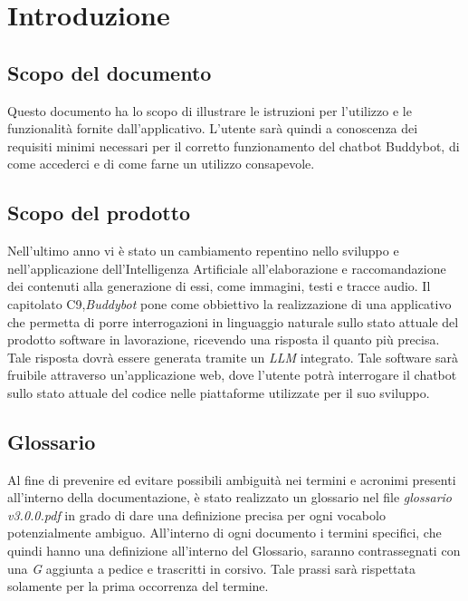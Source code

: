 

\section{Introduzione}
\label{sec:introduzione}

\subsection{Scopo del documento}
Questo documento ha lo scopo di illustrare le istruzioni per l’utilizzo e le funzionalità fornite
dall’applicativo. L’utente sarà quindi a conoscenza dei requisiti minimi necessari per il
corretto funzionamento del chatbot Buddybot, di come accederci e di come farne un utilizzo
consapevole.

\subsection{Scopo del prodotto}
Nell’ultimo anno vi è stato un cambiamento repentino nello sviluppo e nell’applicazione
dell’Intelligenza Artificiale all’elaborazione e raccomandazione dei contenuti alla generazione
di essi, come immagini, testi e tracce audio.
Il capitolato C9,\emph{Buddybot} pone come obbiettivo la realizzazione di una applicativo che permetta di porre interrogazioni in linguaggio naturale sullo stato attuale del prodotto software in lavorazione, ricevendo una risposta il quanto più precisa. Tale risposta dovrà essere generata tramite un \emph{LLM} integrato. Tale software sarà fruibile attraverso un'applicazione web, dove l'utente potrà interrogare il chatbot sullo stato attuale del codice nelle piattaforme utilizzate per il suo sviluppo.

\subsection{Glossario}
Al fine di prevenire ed evitare possibili ambiguità nei termini e acronimi presenti all’interno della documentazione, è stato realizzato un glossario nel file \emph{glossario v3.0.0.pdf} in grado di dare una definizione precisa per ogni vocabolo potenzialmente ambiguo. All’interno di ogni documento i termini specifici, che quindi hanno una definizione all’interno del Glossario, saranno contrassegnati con una \emph{G} aggiunta a pedice e trascritti in corsivo. Tale prassi sarà rispettata solamente per la prima occorrenza del termine.